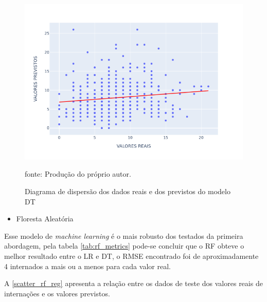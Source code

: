 \documentclass[
  12pt,		%
  a4paper,	%
  openright,%
  oneside,	%
  chapter=TITLE,		%
  section=TITLE,		%
  english,	%
  french,	%
  spanish,	%
  brazil	%
]{abntex2}
\begin{document}
    \begin{figure}[ht]
        \centering
        \caption{Diagrama de dispersão dos dados reais e dos previstos do modelo DT}
        \includegraphics[width=12cm]{../reports/figures/scatter_tree_reg.png}
        \label{scatter_tree_reg}
        \par
        {\small fonte: Produção do próprio autor.}
    \end{figure}

    \begin{itemize}
        \item Floresta Aleatória
    \end{itemize}

    Esse modelo de \textit{machine learning} é o mais robusto dos testados da primeira abordagem, pela tabela \ref*{tab:rf_metrics}
    pode-se concluir que o RF obteve o melhor resultado entre o LR e DT, o RMSE encontrado foi de aproximadamente 4 internados
    a mais ou a menos para cada valor real.

    

    A \ref*{scatter_rf_reg} apresenta a relação entre os dados de teste dos valores reais de internações e os valores previstos.
\end{document}
